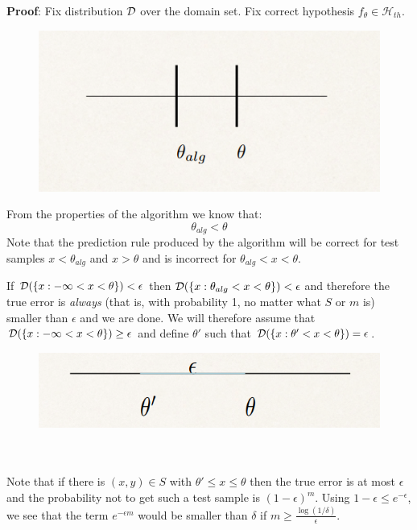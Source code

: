 \documentclass[11pt]{article}
\newcommand{\Hc}{\mathcal{H}}
\begin{document}
\textbf{Proof}:
Fix distribution $\mathcal{D}$ over the domain set. Fix correct hypothesis $f_{\theta}\in \Hc_{th}$.

\begin{figure}[h!]
\centering
\includegraphics[scale=0.3]{thresholds3.png}
\end{figure}


From the properties of the algorithm we know that:
$$\theta_{alg} < \theta$$
Note that the prediction rule produced by the algorithm will be correct for test samples $x<\theta_{alg}$ and $x>\theta$ and is incorrect for $\theta_{alg}<x<\theta$.

\vspace{5mm}

If $\mathcal{D}(\{x: -\infty < x < \theta\})<\epsilon$  then $\mathcal{D}(\{x: \theta_{alg} < x < \theta\})<\epsilon$  and therefore the true error is \textit{always} (that is, with probability 1, no matter what $S$ or $m$ is) smaller than $\epsilon$ and we are done. We will therefore assume that $\mathcal{D}(\{x: -\infty < x < \theta\})\geq \epsilon$  and define $\theta'$ such that $\mathcal{D}(\{x: \theta' < x < \theta\})=\epsilon$.
\begin{figure}[h!]
\centering
\includegraphics[scale=0.3]{thresholds4.png}
\end{figure}
\\~\\
Note that if there is $(x, y)\in S$ with $\theta'\leq x\leq\theta$ then the true error is at most $\epsilon$ and the probability not to get such a test sample is $(1-\epsilon)^m$.
Using  $1-\epsilon \le e^{-\epsilon}$, we see that the term $e^{-\epsilon m}$ would be smaller than $\delta$ if $m \ge  \frac{\log(1/\delta)}{\epsilon}$.
\end{document}
